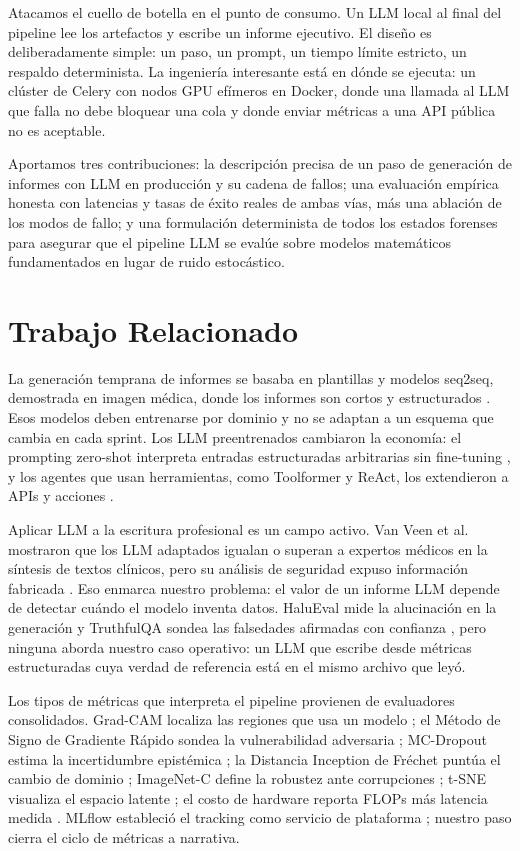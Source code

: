 \documentclass[10pt,twocolumn,letterpaper]{article}
\begin{document}
Atacamos el cuello de botella en el punto de consumo. Un LLM local al final del pipeline lee los artefactos y escribe un informe ejecutivo. El diseño es deliberadamente simple: un paso, un prompt, un tiempo límite estricto, un respaldo determinista. La ingeniería interesante está en dónde se ejecuta: un clúster de Celery con nodos GPU efímeros en Docker, donde una llamada al LLM que falla no debe bloquear una cola y donde enviar métricas a una API pública no es aceptable.

Aportamos tres contribuciones: la descripción precisa de un paso de generación de informes con LLM en producción y su cadena de fallos; una evaluación empírica honesta con latencias y tasas de éxito reales de ambas vías, más una ablación de los modos de fallo; y una formulación determinista de todos los estados forenses para asegurar que el pipeline LLM se evalúe sobre modelos matemáticos fundamentados en lugar de ruido estocástico.

\section{Trabajo Relacionado}
La generación temprana de informes se basaba en plantillas y modelos seq2seq, demostrada en imagen médica, donde los informes son cortos y estructurados \cite{jing2017automatic}. Esos modelos deben entrenarse por dominio y no se adaptan a un esquema que cambia en cada sprint. Los LLM preentrenados cambiaron la economía: el prompting zero-shot interpreta entradas estructuradas arbitrarias sin fine-tuning \cite{brown2020language}, y los agentes que usan herramientas, como Toolformer y ReAct, los extendieron a APIs y acciones \cite{schick2023toolformer,yao2023react}.

Aplicar LLM a la escritura profesional es un campo activo. Van Veen et al. mostraron que los LLM adaptados igualan o superan a expertos médicos en la síntesis de textos clínicos, pero su análisis de seguridad expuso información fabricada \cite{vanveen2024adapted}. Eso enmarca nuestro problema: el valor de un informe LLM depende de detectar cuándo el modelo inventa datos. HaluEval mide la alucinación en la generación \cite{lihalu2023halu} y TruthfulQA sondea las falsedades afirmadas con confianza \cite{lin2022truthfulqa}, pero ninguna aborda nuestro caso operativo: un LLM que escribe desde métricas estructuradas cuya verdad de referencia está en el mismo archivo que leyó.

Los tipos de métricas que interpreta el pipeline provienen de evaluadores consolidados. Grad-CAM localiza las regiones que usa un modelo \cite{selvaraju2017gradcam}; el Método de Signo de Gradiente Rápido sondea la vulnerabilidad adversaria \cite{goodfellow2015explaining}; MC-Dropout estima la incertidumbre epistémica \cite{gal2016dropout,kendall2017uncertainties}; la Distancia Inception de Fr\'echet puntúa el cambio de dominio \cite{heusel2017gans}; ImageNet-C define la robustez ante corrupciones \cite{hendrycks2019benchmarking}; t-SNE visualiza el espacio latente \cite{vandermaaten2008tsne}; el costo de hardware reporta FLOPs más latencia medida \cite{dollar2021fast}. MLflow estableció el tracking como servicio de plataforma \cite{chen2020mlflow}; nuestro paso cierra el ciclo de métricas a narrativa.
\end{document}
